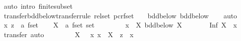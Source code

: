 \begin{isabellebody}
%
\isadelimproof
%
\endisadelimproof
%
\isatagproof
{}\isamarkupfalse%
\ {\isacharparenleft}auto\ intro{\isacharcolon}\ finite{\isacharunderscore}subset{\isacharparenright}%
\endisatagproof
{\isafoldproof}%
%
\isadelimproof
\isanewline
%
\endisadelimproof
\isanewline
{}\isamarkupfalse%
\ transfer{\isacharunderscore}bdd{\isacharunderscore}below{\isacharbrackleft}transfer{\isacharunderscore}rule{\isacharbrackright}{\isacharcolon}\ {\isachardoublequoteopen}{\isacharparenleft}rel{\isacharunderscore}set\ {\isacharparenleft}pcr{\isacharunderscore}fset\ {\isacharparenleft}{\isacharequal}{\isacharparenright}{\isacharparenright}\ {\isacharequal}{\isacharequal}{\isacharequal}{\isachargreater}\ {\isacharparenleft}{\isacharequal}{\isacharparenright}{\isacharparenright}\ bdd{\isacharunderscore}below\ bdd{\isacharunderscore}below{\isachardoublequoteclose}\isanewline
%
\isadelimproof
\ \ %
\endisadelimproof
%
\isatagproof
{}\isamarkupfalse%
\ auto%
\endisatagproof
{\isafoldproof}%
%
\isadelimproof
\isanewline
%
\endisadelimproof
\isanewline
{}\isamarkupfalse%
\isanewline
\isanewline
{}\isamarkupfalse%
\isanewline
%
\isadelimproof
%
\endisadelimproof
%
\isatagproof
{}\isamarkupfalse%
\isanewline
\ \ \isamarkupfalse%
\ x\ z\ {\isacharcolon}{\isacharcolon}\ {\isachardoublequoteopen}{\isacharprime}a\ fset{\isachardoublequoteclose}\isanewline
\ \ \isamarkupfalse%
\ X\ {\isacharcolon}{\isacharcolon}\ {\isachardoublequoteopen}{\isacharprime}a\ fset\ set{\isachardoublequoteclose}\isanewline
\ \ \isacommand{{\isacharbraceleft}}\isamarkupfalse%
\isanewline
\ \ \ \ \isamarkupfalse%
\ {\isachardoublequoteopen}x\ {\isasymin}\ X{\isachardoublequoteclose}\ {\isachardoublequoteopen}bdd{\isacharunderscore}below\ X{\isachardoublequoteclose}\isanewline
\ \ \ \ \isamarkupfalse%
\ \isamarkupfalse%
\ {\isachardoublequoteopen}Inf\ X\ {\isacharbar}{\isasymsubseteq}{\isacharbar}\ x{\isachardoublequoteclose}\ \isamarkupfalse%
\ transfer\ auto\isanewline
\ \ \isamarkupfalse%
\isanewline
\ \ \ \ \isamarkupfalse%
\ {\isachardoublequoteopen}X\ {\isasymnoteq}\ {\isacharbraceleft}{\isacharbraceright}{\isachardoublequoteclose}\ {\isachardoublequoteopen}{\isacharparenleft}{\isasymAnd}x{\isachardot}\ x\ {\isasymin}\ X\ {\isasymLongrightarrow}\ z\ {\isacharbar}{\isasymsubseteq}{\isacharbar}\ x{\isacharparenright}{\isachardoublequoteclose}\isanewline
\ \ \ \ \isamarkupfalse%

\end{isabellebody}
